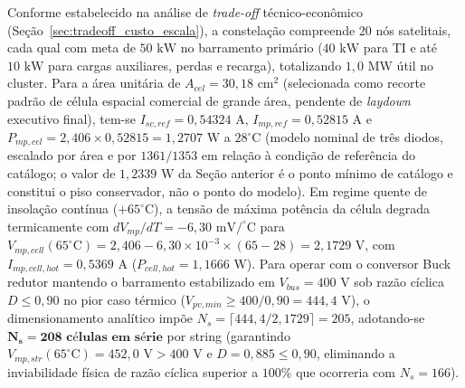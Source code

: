 Conforme estabelecido na análise de \textit{trade-off} técnico-econômico (Seção~\ref{sec:tradeoff_custo_escala}), a constelação compreende 20 nós satelitais, cada qual com meta de $50\text{ kW}$ no barramento primário ($40\text{ kW}$ para TI e até $10\text{ kW}$ para cargas auxiliares, perdas e recarga), totalizando $1{,}0\text{ MW}$ útil no cluster. Para a área unitária de $A_{cel}=30{,}18\text{ cm}^2$ (selecionada como recorte padrão de célula espacial comercial de grande área, pendente de \textit{laydown} executivo final), tem-se $I_{sc,ref}=0{,}54324\text{ A}$, $I_{mp,ref}=0{,}52815\text{ A}$ e $P_{mp,cel}=2{,}406\times0{,}52815=1{,}2707\text{ W}$ a $28^\circ\text{C}$ (modelo nominal de três diodos, escalado por área e por $1361/1353$ em relação à condição de referência do catálogo; o valor de $1{,}2339\text{ W}$ da Seção anterior é o ponto mínimo de catálogo e constitui o piso conservador, não o ponto do modelo). Em regime quente de insolação contínua ($+65^\circ\text{C}$), a tensão de máxima potência da célula degrada termicamente com $dV_{mp}/dT = -6{,}30\text{ mV/}^\circ\text{C}$ para $V_{mp,cell}(65^\circ\text{C}) = 2{,}406 - 6{,}30\times 10^{-3}\times(65 - 28) = 2{,}1729\text{ V}$, com $I_{mp,cell,hot} = 0{,}5369\text{ A}$ ($P_{cell,hot} = 1{,}1666\text{ W}$). Para operar com o conversor Buck redutor mantendo o barramento estabilizado em $V_{bus} = 400\text{ V}$ sob razão cíclica $D \le 0{,}90$ no pior caso térmico ($V_{pv,min} \ge 400 / 0{,}90 = 444{,}4\text{ V}$), o dimensionamento analítico impõe $N_s = \lceil 444{,}4 / 2{,}1729 \rceil = 205$, adotando-se $\mathbf{N_s = 208\text{ células em série}}$ por string (garantindo $V_{mp,str}(65^\circ\text{C}) = 452{,}0\text{ V} > 400\text{ V}$ e $D = 0{,}885 \le 0{,}90$, eliminando a inviabilidade física de razão cíclica superior a $100\%$ que ocorreria com $N_s = 166$). 

